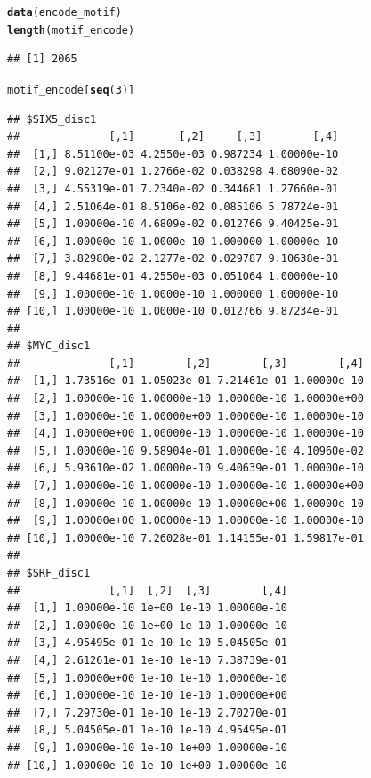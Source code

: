 \documentclass[a4paper,10pt]{article}\usepackage[]{graphicx}\usepackage[]{color}
\makeatletter
\newcommand{\hlnum}[1]{\textcolor[rgb]{0.686,0.059,0.569}{#1}}%
\newcommand{\hlstd}[1]{\textcolor[rgb]{0.345,0.345,0.345}{#1}}%
\newcommand{\hlkwd}[1]{\textcolor[rgb]{0.737,0.353,0.396}{\textbf{#1}}}%
\newenvironment{kframe}{%
 \def\at@end@of@kframe{}%
 \ifinner\ifhmode%
  \def\at@end@of@kframe{\end{minipage}}%
  \begin{minipage}{\columnwidth}%
 \fi\fi%
 \def\FrameCommand##1{\hskip\@totalleftmargin \hskip-\fboxsep
 \colorbox{shadecolor}{##1}\hskip-\fboxsep
     \hskip-\linewidth \hskip-\@totalleftmargin \hskip\columnwidth}%
 \MakeFramed {\advance\hsize-\width
   \@totalleftmargin\z@ \linewidth\hsize
   \@setminipage}}%
 {\par\unskip\endMakeFramed%
 \at@end@of@kframe}
\newenvironment{knitrout}{}{} %
\makeatother
\begin{document}
\begin{knitrout}
\end{knitrout}

\begin{knitrout}
\color{fgcolor}\begin{kframe}
\begin{alltt}
\hlkwd{data}\hlstd{(encode_motif)}
\hlkwd{length}\hlstd{(motif_encode)}
\end{alltt}
\begin{verbatim}
## [1] 2065
\end{verbatim}
\begin{alltt}
\hlstd{motif_encode[}\hlkwd{seq}\hlstd{(}\hlnum{3}\hlstd{)]}
\end{alltt}
\begin{verbatim}
## $SIX5_disc1
##              [,1]       [,2]     [,3]        [,4]
##  [1,] 8.51100e-03 4.2550e-03 0.987234 1.00000e-10
##  [2,] 9.02127e-01 1.2766e-02 0.038298 4.68090e-02
##  [3,] 4.55319e-01 7.2340e-02 0.344681 1.27660e-01
##  [4,] 2.51064e-01 8.5106e-02 0.085106 5.78724e-01
##  [5,] 1.00000e-10 4.6809e-02 0.012766 9.40425e-01
##  [6,] 1.00000e-10 1.0000e-10 1.000000 1.00000e-10
##  [7,] 3.82980e-02 2.1277e-02 0.029787 9.10638e-01
##  [8,] 9.44681e-01 4.2550e-03 0.051064 1.00000e-10
##  [9,] 1.00000e-10 1.0000e-10 1.000000 1.00000e-10
## [10,] 1.00000e-10 1.0000e-10 0.012766 9.87234e-01
## 
## $MYC_disc1
##              [,1]        [,2]        [,3]        [,4]
##  [1,] 1.73516e-01 1.05023e-01 7.21461e-01 1.00000e-10
##  [2,] 1.00000e-10 1.00000e-10 1.00000e-10 1.00000e+00
##  [3,] 1.00000e-10 1.00000e+00 1.00000e-10 1.00000e-10
##  [4,] 1.00000e+00 1.00000e-10 1.00000e-10 1.00000e-10
##  [5,] 1.00000e-10 9.58904e-01 1.00000e-10 4.10960e-02
##  [6,] 5.93610e-02 1.00000e-10 9.40639e-01 1.00000e-10
##  [7,] 1.00000e-10 1.00000e-10 1.00000e-10 1.00000e+00
##  [8,] 1.00000e-10 1.00000e-10 1.00000e+00 1.00000e-10
##  [9,] 1.00000e+00 1.00000e-10 1.00000e-10 1.00000e-10
## [10,] 1.00000e-10 7.26028e-01 1.14155e-01 1.59817e-01
## 
## $SRF_disc1
##              [,1]  [,2]  [,3]        [,4]
##  [1,] 1.00000e-10 1e+00 1e-10 1.00000e-10
##  [2,] 1.00000e-10 1e+00 1e-10 1.00000e-10
##  [3,] 4.95495e-01 1e-10 1e-10 5.04505e-01
##  [4,] 2.61261e-01 1e-10 1e-10 7.38739e-01
##  [5,] 1.00000e+00 1e-10 1e-10 1.00000e-10
##  [6,] 1.00000e-10 1e-10 1e-10 1.00000e+00
##  [7,] 7.29730e-01 1e-10 1e-10 2.70270e-01
##  [8,] 5.04505e-01 1e-10 1e-10 4.95495e-01
##  [9,] 1.00000e-10 1e-10 1e+00 1.00000e-10
## [10,] 1.00000e-10 1e-10 1e+00 1.00000e-10
\end{verbatim}
\end{kframe}
\end{knitrout}
\end{document}
